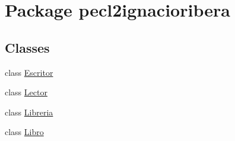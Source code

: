 \hypertarget{namespacepecl2ignacioribera}{}\section{Package pecl2ignacioribera}
\label{namespacepecl2ignacioribera}
\subsection*{Classes}
\begin{DoxyCompactItemize}
\item 
class \mbox{\hyperlink{classpecl2ignacioribera_1_1_escritor}{Escritor}}
\item 
class \mbox{\hyperlink{classpecl2ignacioribera_1_1_lector}{Lector}}
\item 
class \mbox{\hyperlink{classpecl2ignacioribera_1_1_libreria}{Libreria}}
\item 
class \mbox{\hyperlink{classpecl2ignacioribera_1_1_libro}{Libro}}
\end{DoxyCompactItemize}
